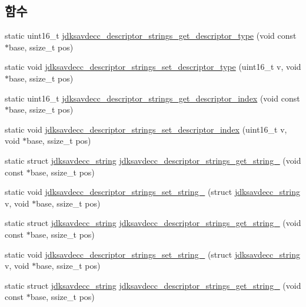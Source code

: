 \subsection*{함수}
\begin{DoxyCompactItemize}
\item 
static uint16\+\_\+t \hyperlink{group__descriptor__strings_gaefaeb02e3e054cbf2e4978af56765514}{jdksavdecc\+\_\+descriptor\+\_\+strings\+\_\+get\+\_\+descriptor\+\_\+type} (void const $\ast$base, ssize\+\_\+t pos)
\item 
static void \hyperlink{group__descriptor__strings_gafcdbc526ad49d09b4f56b533fbac4694}{jdksavdecc\+\_\+descriptor\+\_\+strings\+\_\+set\+\_\+descriptor\+\_\+type} (uint16\+\_\+t v, void $\ast$base, ssize\+\_\+t pos)
\item 
static uint16\+\_\+t \hyperlink{group__descriptor__strings_ga4460bc1890e0e4f39f439389987cb515}{jdksavdecc\+\_\+descriptor\+\_\+strings\+\_\+get\+\_\+descriptor\+\_\+index} (void const $\ast$base, ssize\+\_\+t pos)
\item 
static void \hyperlink{group__descriptor__strings_ga63342f037d1d64c1422073fe797ff7d8}{jdksavdecc\+\_\+descriptor\+\_\+strings\+\_\+set\+\_\+descriptor\+\_\+index} (uint16\+\_\+t v, void $\ast$base, ssize\+\_\+t pos)
\item 
static struct \hyperlink{structjdksavdecc__string}{jdksavdecc\+\_\+string} \hyperlink{group__descriptor__strings_ga25ee0abe2a7ea4b9c4a8db0406eaf751}{jdksavdecc\+\_\+descriptor\+\_\+strings\+\_\+get\+\_\+string\+\_} (void const $\ast$base, ssize\+\_\+t pos)
\item 
static void \hyperlink{group__descriptor__strings_ga612bb2728d694ba394037a3dfe518213}{jdksavdecc\+\_\+descriptor\+\_\+strings\+\_\+set\+\_\+string\+\_} (struct \hyperlink{structjdksavdecc__string}{jdksavdecc\+\_\+string} v, void $\ast$base, ssize\+\_\+t pos)
\item 
static struct \hyperlink{structjdksavdecc__string}{jdksavdecc\+\_\+string} \hyperlink{group__descriptor__strings_gaf170c1a7c40a8104560b1a5be607bffb}{jdksavdecc\+\_\+descriptor\+\_\+strings\+\_\+get\+\_\+string\+\_} (void const $\ast$base, ssize\+\_\+t pos)
\item 
static void \hyperlink{group__descriptor__strings_gaac88d1eee314e285a26b63938d55bc2a}{jdksavdecc\+\_\+descriptor\+\_\+strings\+\_\+set\+\_\+string\+\_} (struct \hyperlink{structjdksavdecc__string}{jdksavdecc\+\_\+string} v, void $\ast$base, ssize\+\_\+t pos)
\item 
static struct \hyperlink{structjdksavdecc__string}{jdksavdecc\+\_\+string} \hyperlink{group__descriptor__strings_ga8f855f3da55d595b0c2728c3e9c784eb}{jdksavdecc\+\_\+descriptor\+\_\+strings\+\_\+get\+\_\+string\+\_} (void const $\ast$base, ssize\+\_\+t pos)

\end{DoxyCompactItemize}
